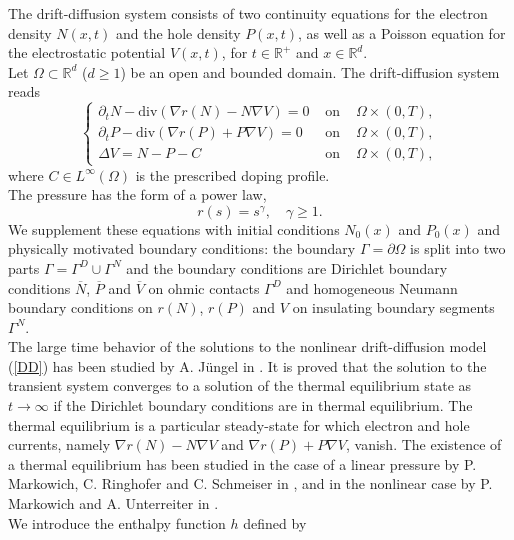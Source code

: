 \documentclass[smallextended]{svjour3}
\def\pa{\partial}
\def\pa{\partial}
\begin{document}
The drift-diffusion system consists of two continuity equations for the electron density $N(x,t)$ and the hole density $P(x,t)$, as well as a Poisson equation for the electrostatic potential $V(x,t)$, for $t \in \mathbb{R}^{+}$ and $x \in \mathbb{R}^{d}$.\\
Let $\Omega \subset \mathbb{R}^{d}$ ($d \geq 1$) be an open and bounded domain. The drift-diffusion system reads 
\begin{equation}
\left\{\begin{array}{lcl} \pa_{t}N-\text{div}(\nabla r(N)-N\nabla V)=0 & \text{ on } & \Omega \times (0,T), \\
\pa_{t}P-\text{div}(\nabla r(P)+P\nabla V)=0 & \text{ on } & \Omega \times (0,T),  \\
\Delta V=N-P-C & \text{ on } & \Omega \times (0,T),\end{array}\right.
\label{DD}
\end{equation}
where $C \in L^{\infty}(\Omega)$ is the prescribed doping profile.\\
The pressure has the form of a power law,
\begin{equation*}
r(s)=s^{\gamma}, \quad \gamma \geq 1.
\end{equation*} 
We supplement these equations with initial conditions $N_{0}(x)$ and $P_{0}(x)$ and physically motivated boundary conditions: the boundary $\Gamma=\pa \Omega$ is split into two parts $\Gamma=\Gamma^{D} \cup \Gamma^{N}$ and the boundary conditions are Dirichlet boundary conditions $ \overline{N}$, $ \overline{P}$ and $ \overline{V}$ on ohmic contacts $\Gamma^{D}$ and homogeneous Neumann boundary conditions on $r(N)$, $r(P)$ and $V$ on insulating boundary segments $\Gamma^{N}$.\\
The large time behavior of the solutions to the nonlinear drift-diffusion model (\ref{DD}) has been studied by A. Jüngel in \cite{Juengel1995a}. It is proved that the solution to the transient system converges to a solution of the thermal equilibrium state as $t \rightarrow \infty$ if the Dirichlet boundary conditions are in thermal equilibrium. The thermal equilibrium is a particular steady-state for which electron and hole currents, namely $\nabla r(N)-N\nabla V$ and $\nabla r(P)+P\nabla V$, vanish. The existence of a thermal equilibrium has been studied in the case of a linear pressure by P. Markowich, C. Ringhofer and C. Schmeiser in \cite{Markowich1986,Markowich1990}, and in the nonlinear case by P. Markowich and A. Unterreiter in \cite{Markowich1993}.\\
We introduce the enthalpy function $h$ defined by
\end{document}
